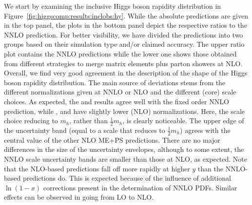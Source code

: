 We start by examining the inclusive Higgs boson rapidity distribution in
Figure~\ref{fig:higgscomp:results:inclobs:hy}. While the absolute
predictions are given in the top panel, the plots in the bottom panel
depict the respective ratios to the NNLO prediction. For better
visibility, we have divided the predictions into two groups based on
their simulation type and/or claimed accuracy. The upper ratio plot
contains the NNLO predictions while the lower one shows those obtained
from different strategies to merge matrix elements plus parton showers
at NLO. Overall, we find very good agreement in the description of the
shape of the Higgs boson rapidity distribution. The main source of deviations stems
from the different normalizations given at NNLO or NLO and the
different (core) scale choices. As expected, the \Sherpa \NNLOPS and
\Powheg \NNLOPS results agree well with the fixed order NNLO prediction,
while \MGaMC, \Sherpa and \Herwig have slightly lower (NLO)
normalizations.  Here, the \MGaMC scale choice reducing to
$m_h$, rather than $\tfrac{1}{2}m_h$, is clearly noticeable. The upper edge of
the \MGaMC uncertainty band (equal to a scale that reduces to $\tfrac{1}{2}m_h$)
agrees with the central value of the other NLO ME+PS
predictions. There are no major differences in the size of the
uncertainty envelopes, although to some extent, the NNLO scale
uncertainty bands are smaller than those at NLO, as expected. Note
that the NLO-based predictions fall off more rapidly at higher $y$
than the NNLO-based predictions do. This is expected because of the
influence of additional $\ln(1-x)$ corrections present in the
determination of NNLO PDFs. Similar effects can be observed in going
from LO to NLO.

